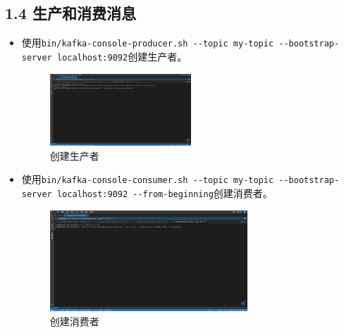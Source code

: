 \documentclass{article}
\begin{document}
\subsection*{1.4 生产和消费消息}
\begin{itemize}
    \item 使用\lstinline[style=Style]|bin/kafka-console-producer.sh --topic my-topic --bootstrap-server localhost:9092|创建生产者。
    \begin{figure}[H]
        \centering
        \includegraphics[width=0.5\textwidth]{./pic/6.png}
        \caption{创建生产者}
    \end{figure}
    \item 使用\lstinline[style=Style]|bin/kafka-console-consumer.sh --topic my-topic --bootstrap-server localhost:9092 --from-beginning|创建消费者。
    \begin{figure}[H]
        \centering
        \includegraphics[width=0.7\textwidth]{./pic/7.png}
        \caption{创建消费者}
    \end{figure}
\end{itemize}
\end{document}
